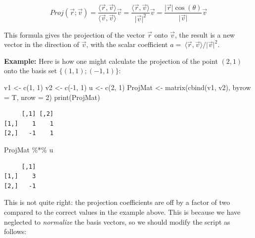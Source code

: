 \documentclass[
  letterpaper,
  DIV=11,
  numbers=noendperiod]{scrreprt}
\newenvironment{Shaded}{\begin{snugshade}}{\end{snugshade}}
\newcommand{\AttributeTok}[1]{\textcolor[rgb]{0.40,0.45,0.13}{#1}}
\newcommand{\DecValTok}[1]{\textcolor[rgb]{0.68,0.00,0.00}{#1}}
\newcommand{\FunctionTok}[1]{\textcolor[rgb]{0.28,0.35,0.67}{#1}}
\newcommand{\NormalTok}[1]{\textcolor[rgb]{0.00,0.23,0.31}{#1}}
\newcommand{\OtherTok}[1]{\textcolor[rgb]{0.00,0.23,0.31}{#1}}
\newcommand{\SpecialCharTok}[1]{\textcolor[rgb]{0.37,0.37,0.37}{#1}}
\begin{document}
\[ 
Proj(\vec r ; \vec v) = \frac{ \langle \vec r , \vec v \rangle  } {\langle \vec v , \vec v \rangle } \vec v = \frac{ \langle \vec r ,  \vec v \rangle  } {\vert \vec v \vert^2} \vec v= \frac{  \vert\vec r\vert \cos(\theta) } {\vert \vec v \vert}\vec v
\]

This formula gives the projection of the vector \(\vec r\) onto
\(\vec v\), the result is a new vector in the direction of \(\vec v\),
with the scalar coefficient
\(a = \ \langle \vec r , \vec v \rangle /\vert \vec v \vert^2\).

\textbf{Example:} Here is how one might calculate the projection of the
point \((2,1)\) onto the basis set \(\{(1,1); (-1,1)\}\):

\begin{Shaded}
\begin{Highlighting}[]
\NormalTok{v1 }\OtherTok{\textless{}{-}} \FunctionTok{c}\NormalTok{(}\DecValTok{1}\NormalTok{, }\DecValTok{1}\NormalTok{)}
\NormalTok{v2 }\OtherTok{\textless{}{-}} \FunctionTok{c}\NormalTok{(}\SpecialCharTok{{-}}\DecValTok{1}\NormalTok{, }\DecValTok{1}\NormalTok{)}
\NormalTok{u }\OtherTok{\textless{}{-}} \FunctionTok{c}\NormalTok{(}\DecValTok{2}\NormalTok{, }\DecValTok{1}\NormalTok{)}
\NormalTok{ProjMat }\OtherTok{\textless{}{-}} \FunctionTok{matrix}\NormalTok{(}\FunctionTok{cbind}\NormalTok{(v1, v2), }
                  \AttributeTok{byrow =}\NormalTok{ T, }\AttributeTok{nrow =} \DecValTok{2}\NormalTok{)}
\FunctionTok{print}\NormalTok{(ProjMat)}
\end{Highlighting}
\end{Shaded}

\begin{verbatim}
     [,1] [,2]
[1,]    1    1
[2,]   -1    1
\end{verbatim}

\begin{Shaded}
\begin{Highlighting}[]
\NormalTok{ProjMat }\SpecialCharTok{\%*\%}\NormalTok{ u}
\end{Highlighting}
\end{Shaded}

\begin{verbatim}
     [,1]
[1,]    3
[2,]   -1
\end{verbatim}

This is not quite right: the projection coefficients are off by a factor
of two compared to the correct values in the example above. This is
because we have neglected to \emph{normalize} the basis vectors, so we
should modify the script as follows:
\end{document}
